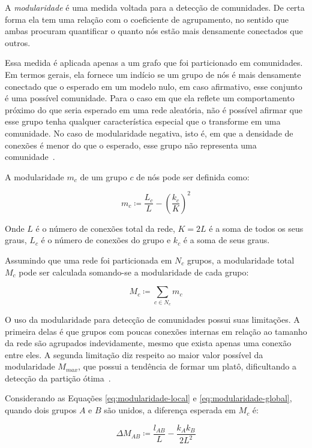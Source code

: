 \documentclass[12pt,a4paper,final]{article}
\newcommand{\defn}{\coloneqq} %
\begin{document}
A \textit{modularidade} é uma medida voltada para a detecção de comunidades. De certa forma ela tem uma relação com o coeficiente de agrupamento, no sentido que ambas procuram quantificar o quanto nós estão mais densamente conectados que outros.

Essa medida é aplicada apenas a um grafo que foi particionado em comunidades. Em termos gerais, ela fornece um indício se um grupo de nós é mais densamente conectado que o esperado em um modelo nulo, em caso afirmativo, esse conjunto é uma possível comunidade. Para o caso em que ela reflete um comportamento próximo do que seria esperado em uma rede aleatória, não é possível afirmar que esse grupo tenha qualquer característica especial que o transforme em uma comunidade. No caso de modularidade negativa, isto é, em que a densidade de conexões é menor do que o esperado, esse grupo não representa uma comunidade~\cite{Barabasi2016-rn}.

A modularidade $m_c$ de um grupo $c$ de nós pode ser definida como:

\begin{equation} \label{eq:modularidade-local}
m_c \defn \frac{L_c}{L} - \left( \frac{k_c}{K} \right)^2
\end{equation}

Onde $L$ é o número de conexões total da rede, $K = 2L$ é a soma de todos os seus graus, $L_c$ é o número de conexões do grupo e $k_c$ é a soma de seus graus.

Assumindo que uma rede foi particionada em $N_c$ grupos, a modularidade total $M_c$ pode ser calculada somando-se a modularidade de cada grupo:

\begin{equation} \label{eq:modularidade-global}
M_c \defn \sum_{c \in N_c} m_c
\end{equation}

O uso da modularidade para detecção de comunidades possui suas limitações. A primeira delas é que grupos com poucas conexões internas em relação ao tamanho da rede são agrupados indevidamente, mesmo que exista apenas uma conexão entre eles. A segunda limitação diz respeito ao maior valor possível da modularidade $M_\textit{max}$, que possui a tendência de formar um platô, dificultando a detecção da partição ótima~\cite{Barabasi2016-rn}.

Considerando as Equações \ref{eq:modularidade-local} e \ref{eq:modularidade-global}, quando dois grupos $A$ e $B$ são unidos, a diferença esperada em $M_c$ é:

\begin{equation}
\Delta M_{AB} \defn \frac{l_{AB}}{L} - \frac{k_A k_B}{2L^2}
\end{equation}
\end{document}
